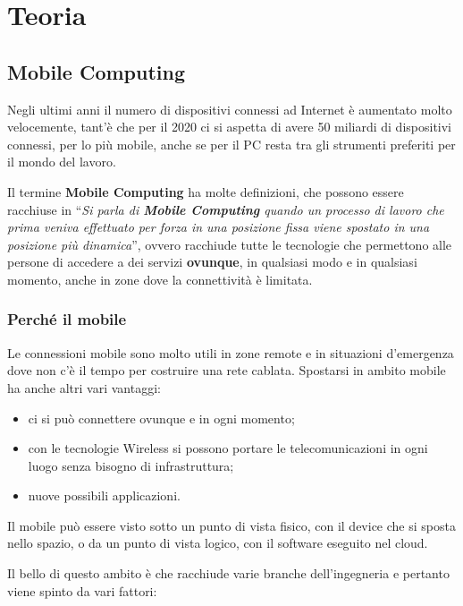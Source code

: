 \part{Teoria}

\chapter{Mobile Computing}
\label{mobile-computing}

Negli ultimi anni il numero di dispositivi connessi ad Internet è
aumentato molto velocemente, tant'è che per il 2020 ci si aspetta di
avere 50 miliardi di dispositivi connessi, per lo più mobile, anche se
per il PC resta tra gli strumenti preferiti per il mondo del lavoro.

Il termine \textbf{Mobile Computing} ha molte definizioni, che possono
essere racchiuse in ``\emph{Si parla di \textbf{Mobile Computing} quando
un processo di lavoro che prima veniva effettuato per forza in una
posizione fissa viene spostato in una posizione più dinamica}'', ovvero
racchiude tutte le tecnologie che permettono alle persone di accedere a
dei servizi \textbf{ovunque}, in qualsiasi modo e in qualsiasi momento, anche
in zone dove la connettività è limitata.

\section{Perché il mobile}

Le connessioni mobile sono molto utili in zone remote e in situazioni 
d'emergenza dove non c'è il tempo per costruire una rete cablata.
Spostarsi in ambito mobile ha anche altri vari vantaggi:

\begin{itemize}
\item ci si può connettere ovunque e in ogni momento;
\item con le tecnologie Wireless si possono portare le telecomunicazioni in
  ogni luogo senza bisogno di infrastruttura;
\item nuove possibili applicazioni.
\end{itemize}

Il mobile può essere visto sotto un punto di vista fisico, con il
device che si sposta nello spazio, o da un punto di vista logico, con il
software eseguito nel cloud.

Il bello di questo ambito è che racchiude varie branche dell'ingegneria
e pertanto viene spinto da vari fattori:

